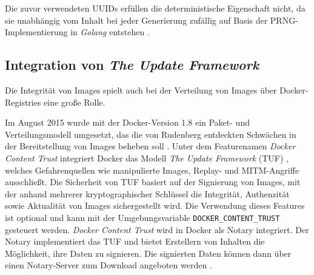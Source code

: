 \documentclass[../main.tex]{subfiles}
\begin{document}
      Die zuvor verwendeten UUIDs erfüllen die deterministische Eigenschaft nicht, da sie unabhängig vom Inhalt bei jeder Generierung zufällig auf Basis der PRNG-Implementierung in \emph{Golang} entstehen \cite{githubImageUUID}.





    \subsection{Integration von \emph{The Update Framework}}
    \label{tuf}
      Die Integrität von Images spielt auch bei der Verteilung von Images über Docker-Registries eine große Rolle.

      Im August 2015 wurde mit der Docker-Version 1.8 ein Paket- und Verteilungsmodell umgesetzt, das die von Rudenberg entdeckten Schwächen in der Bereitstellung von Images beheben soll \cite{dockerContentTrust}. Unter dem Featurenamen \emph{Docker Content Trust} integriert Docker das Modell \emph{The Update Framework} (\acrshort{TUF}) \cite{tufFramework}, welches Gefahrenquellen wie manipulierte Images, Replay- und MITM-Angriffe ausschließt. Die Sicherheit von TUF basiert auf der Signierung von Images, mit der anhand mehrerer kryptographischer Schlüssel die Integrität, Authenzität sowie Aktualität von Images sichergestellt wird. Die Verwendung dieses Features ist optional und kann mit der Umgebungsvariable \texttt{DOCKER\_CONTENT\_TRUST} gesteuert werden. \emph{Docker Content Trust} wird in Docker als Notary integriert. Der Notary implementiert das TUF und bietet Erstellern von Inhalten die Möglichkeit, ihre Daten zu signieren. Die signierten Daten können dann über einen Notary-Server zum Download angeboten werden \cite{githubNotary}\cite{dockerContentTrust}.
\end{document}
